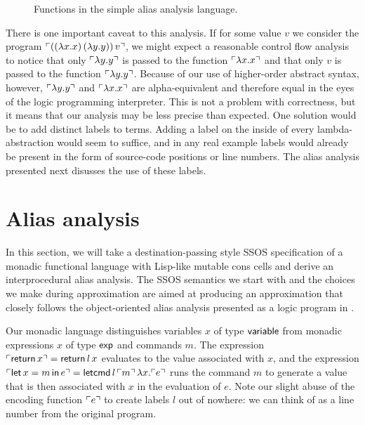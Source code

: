 \begin{figure}
\caption{Functions in the simple alias analysis language.}
\label{fig:ssos-monadic}
\end{figure}

There is one important caveat to this analysis. If for some value $v$
we consider the program ${\ulcorner{((\lambda x.x)\,(\lambda y.y))\,v}\urcorner}$,
we might expect a reasonable control flow analysis to notice that only
${\ulcorner{\lambda y.y}\urcorner}$ is passed to the function ${\ulcorner{\lambda
  x.x}\urcorner}$ and that only $v$ is passed to the function ${\ulcorner{\lambda
  y.y}\urcorner}$. Because of our use of higher-order abstract syntax, however,
${\ulcorner{\lambda y.y}\urcorner}$ and ${\ulcorner{\lambda x.x}\urcorner}$ are alpha-equivalent
and therefore equal in the eyes of the logic programming
interpreter. This is not a problem with correctness, but it means that
our analysis may be less precise than expected. One solution would be
to add distinct labels to terms. Adding a label on the inside of every
lambda-abstraction would seem to suffice, and in any real example
labels would already be present in the form of source-code positions
or line numbers. The alias analysis presented next disusses the use of
these labels.



\section{Alias analysis}

In this section, we will take a destination-passing style SSOS
specification of a monadic functional language with Lisp-like mutable
cons cells and derive an interprocedural alias analysis. The SSOS
semantics we start with and the choices we make during approximation
are aimed at producing an approximation that closely follows the
object-oriented alias analysis presented as a logic program in
\cite[Chapter 12.4]{aho07compilers}.

Our monadic language distinguishes variables $x$ of type ${\sf
  variable}$ from monadic expressions $x$ of type ${\sf exp}$ and
commands $m$. The expression ${\ulcorner{{\sf return}\,x}\urcorner} = {\sf
  return}\,l\,x$ evaluates to the value associated with $x$, and the
expression ${\ulcorner{{\sf let}\,x = m\,{\sf in}\,e}\urcorner} = {\sf
  letcmd}\,l\,{\ulcorner{m}\urcorner}\,\lambda x.{\ulcorner{e}\urcorner}$ runs the command $m$
to generate a value that is then associated with $x$ in the evaluation
of $e$. Note our slight abuse of the encoding function ${\ulcorner{e}\urcorner}$ to
create labels $l$ out of nowhere: we can think of as a line number
from the original program. 

